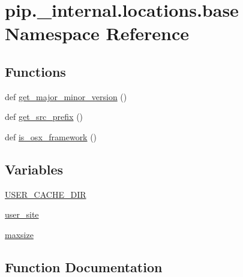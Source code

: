 \hypertarget{namespacepip_1_1__internal_1_1locations_1_1base}{}\section{pip.\+\_\+internal.\+locations.\+base Namespace Reference}
\label{namespacepip_1_1__internal_1_1locations_1_1base}
\subsection*{Functions}
\begin{DoxyCompactItemize}
\item 
def \hyperlink{namespacepip_1_1__internal_1_1locations_1_1base_a8add1fac6af2740c5dfaab933ae2b4db}{get\+\_\+major\+\_\+minor\+\_\+version} ()
\item 
def \hyperlink{namespacepip_1_1__internal_1_1locations_1_1base_abb29fd9aa24b893e2dccf200aa6ea99b}{get\+\_\+src\+\_\+prefix} ()
\item 
def \hyperlink{namespacepip_1_1__internal_1_1locations_1_1base_aecc2c54fff1431c62a51f93ed4684d31}{is\+\_\+osx\+\_\+framework} ()
\end{DoxyCompactItemize}
\subsection*{Variables}
\begin{DoxyCompactItemize}
\item 
\hyperlink{namespacepip_1_1__internal_1_1locations_1_1base_a9560ef3b9092e974dbb8246a86cd6ed3}{U\+S\+E\+R\+\_\+\+C\+A\+C\+H\+E\+\_\+\+D\+IR}
\item 
\hyperlink{namespacepip_1_1__internal_1_1locations_1_1base_a40dffd9a1453f8ce97cbd16e4a7ab1d8}{user\+\_\+site}
\item 
\hyperlink{namespacepip_1_1__internal_1_1locations_1_1base_a6bce8bf70e8883ff1e069fda88b844e6}{maxsize}
\end{DoxyCompactItemize}


\subsection{Function Documentation}
\mbox{\label{namespacepip_1_1__internal_1_1locations_1_1base_a8add1fac6af2740c5dfaab933ae2b4db}} 
